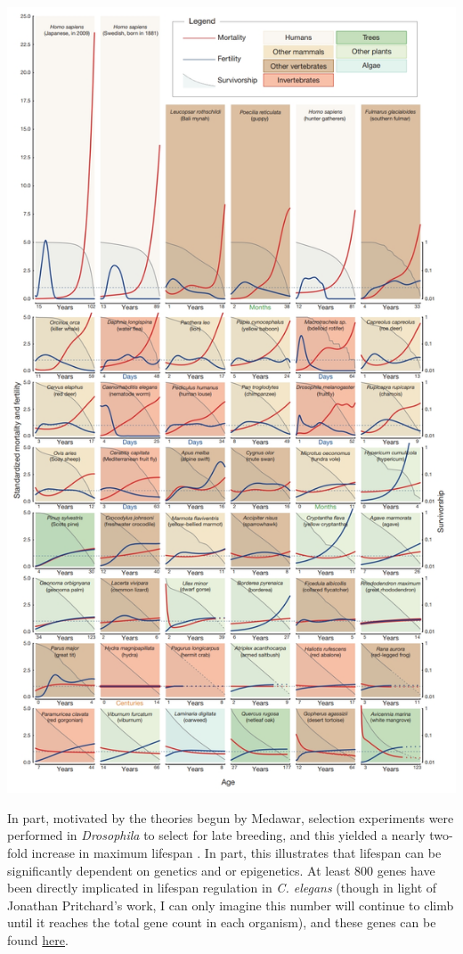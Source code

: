 \documentclass[]{book}
\begin{document}
\includegraphics{images/04-7.jpg}

In part, motivated by the theories begun by Medawar, selection experiments were performed in \emph{Drosophila} to select for late breeding, and this yielded a nearly two-fold increase in maximum lifespan \citep{rose1980test}. In part, this illustrates that lifespan can be significantly dependent on genetics and or epigenetics. At least 800 genes have been directly implicated in lifespan regulation in \emph{C. elegans} (though in light of Jonathan Pritchard's work, I can only imagine this number will continue to climb until it reaches the total gene count in each organism), and these genes can be found \href{http://genomics.senescence.info/genes/search.php?organism=Caenorhabditis+elegans\&show=4}{here}.
\end{document}
